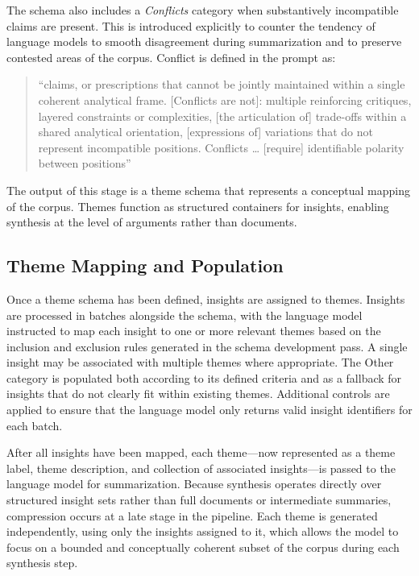 \documentclass[
  11pt,
]{article}
\begin{document}
The schema also includes a \emph{Conflicts} category when substantively
incompatible claims are present. This is introduced explicitly to
counter the tendency of language models to smooth disagreement during
summarization and to preserve contested areas of the corpus. Conflict is
defined in the prompt as:

\begin{quote}
``claims, or prescriptions that cannot be jointly maintained within a
single coherent analytical frame. {[}Conflicts are not{]}: multiple
reinforcing critiques, layered constraints or complexities, {[}the
articulation of{]} trade-offs within a shared analytical orientation,
{[}expressions of{]} variations that do not represent incompatible
positions. Conflicts \ldots{} {[}require{]} identifiable polarity
between positions''
\end{quote}

The output of this stage is a theme schema that represents a conceptual
mapping of the corpus. Themes function as structured containers for
insights, enabling synthesis at the level of arguments rather than
documents.

\subsection{Theme Mapping and
Population}\label{theme-mapping-and-population}

Once a theme schema has been defined, insights are assigned to themes.
Insights are processed in batches alongside the schema, with the
language model instructed to map each insight to one or more relevant
themes based on the inclusion and exclusion rules generated in the
schema development pass. A single insight may be associated with
multiple themes where appropriate. The Other category is populated both
according to its defined criteria and as a fallback for insights that do
not clearly fit within existing themes. Additional controls are applied
to ensure that the language model only returns valid insight identifiers
for each batch.

After all insights have been mapped, each theme---now represented as a
theme label, theme description, and collection of associated
insights---is passed to the language model for summarization. Because
synthesis operates directly over structured insight sets rather than
full documents or intermediate summaries, compression occurs at a late
stage in the pipeline. Each theme is generated independently, using only
the insights assigned to it, which allows the model to focus on a
bounded and conceptually coherent subset of the corpus during each
synthesis step.
\end{document}
